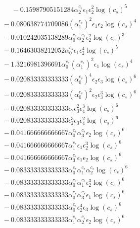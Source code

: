 \documentclass[10pt]{article}
\begin{document}
\begin{align*}
\phantom{F_{s,6}} &\phantom{={}}{}  - 0.15987905151284 \alpha_{2}^{c_s} \epsilon_{1} \epsilon_{2}^{2} \log{\left(c_{s} \right)}^{5} \\
&{}  - 0.080638774709086 \left(\alpha_{1}^{c_s}\right)^{2} \epsilon_{1} \epsilon_{2} \log{\left(c_{s} \right)}^{4} \\
&{}  - 0.010242035138289 \alpha_{0}^{c_s} \alpha_{2}^{c_s} \epsilon_{2}^{2} \log{\left(c_{s} \right)}^{3} \\
&{}  - 0.16463038212052 \alpha_{0}^{c_s} \epsilon_{1} \epsilon_{2}^{4} \log{\left(c_{s} \right)}^{5} \\
&{}  - 1.3216981396691 \alpha_{0}^{c_s} \left(\alpha_{1}^{c_s}\right)^{2} \epsilon_{1} \log{\left(c_{s} \right)}^{4} \\
&{}  - 0.020833333333333 \left(\alpha_{0}^{c_s}\right)^{4} \epsilon_{2} \epsilon_{3} \log{\left(c_{s} \right)}^{6} \\
&{}  - 0.020833333333333 \left(\alpha_{0}^{c_s}\right)^{2} \epsilon_{2} \epsilon_{3}^{3} \log{\left(c_{s} \right)}^{6} \\
&{}  - 0.020833333333333 \epsilon_{2} \epsilon_{3}^{2} \epsilon_{4}^{3} \log{\left(c_{s} \right)}^{6} \\
&{}  - 0.020833333333333 \epsilon_{2}^{3} \epsilon_{3} \epsilon_{4}^{2} \log{\left(c_{s} \right)}^{6} \\
&{}  - 0.041666666666667 \alpha_{0}^{c_s} \alpha_{3}^{c_s} \epsilon_{2} \log{\left(c_{s} \right)}^{6} \\
&{}  - 0.041666666666667 \alpha_{1}^{c_s} \epsilon_{1} \epsilon_{2}^{3} \log{\left(c_{s} \right)}^{6} \\
&{}  - 0.041666666666667 \alpha_{3}^{c_s} \epsilon_{1} \epsilon_{2} \log{\left(c_{s} \right)}^{6} \\
&{}  - 0.083333333333333 \alpha_{0}^{c_s} \alpha_{1}^{c_s} \alpha_{2}^{c_s} \log{\left(c_{s} \right)}^{6} \\
&{}  - 0.083333333333333 \alpha_{0}^{c_s} \alpha_{1}^{c_s} \epsilon_{2}^{3} \log{\left(c_{s} \right)}^{6} \\
&{}  - 0.083333333333333 \alpha_{0}^{c_s} \alpha_{3}^{c_s} \epsilon_{1} \log{\left(c_{s} \right)}^{6} \\
&{}  - 0.083333333333333 \alpha_{0}^{c_s} \epsilon_{2}^{4} \epsilon_{3} \log{\left(c_{s} \right)}^{6} \\
&{}  - 0.083333333333333 \alpha_{1}^{c_s} \alpha_{2}^{c_s} \epsilon_{2} \log{\left(c_{s} \right)}^{6} \\

\end{align*}
\end{document}
